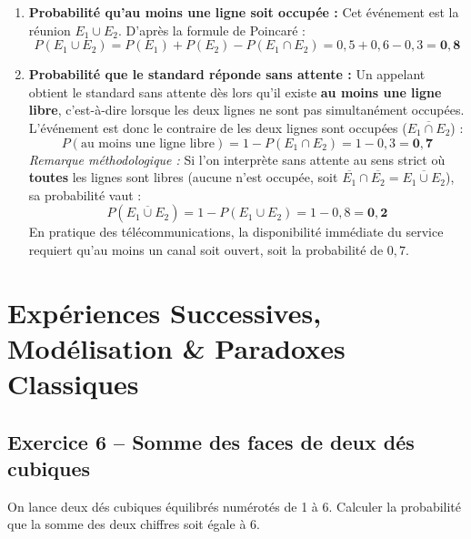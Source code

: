 \documentclass[11pt,a4paper]{article}
\begin{document}
\begin{correctionbox}
\begin{enumerate}[label=\arabic*.]
    \item \textbf{Probabilité qu'au moins une ligne soit occupée :}
    Cet événement est la réunion $E_1 \cup E_2$. D'après la formule de Poincaré :
    \[
    P(E_1 \cup E_2) = P(E_1) + P(E_2) - P(E_1 \cap E_2) = 0{,}5 + 0{,}6 - 0{,}3 = \mathbf{0{,}8}
    \]

    \item \textbf{Probabilité que le standard réponde sans attente :}
    Un appelant obtient le standard sans attente dès lors qu'il existe \textbf{au moins une ligne libre}, c'est-à-dire lorsque les deux lignes ne sont pas simultanément occupées.
    L'événement est donc le contraire de \og les deux lignes sont occupées \fg{} ($\overline{E_1 \cap E_2}$) :
    \[
    P(\text{au moins une ligne libre}) = 1 - P(E_1 \cap E_2) = 1 - 0{,}3 = \mathbf{0{,}7}
    \]
    \emph{Remarque méthodologique :} Si l'on interprète \og sans attente \fg{} au sens strict où \textbf{toutes} les lignes sont libres (aucune n'est occupée, soit $\overline{E_1} \cap \overline{E_2} = \overline{E_1 \cup E_2}$), sa probabilité vaut :
    \[
    P(\overline{E_1 \cup E_2}) = 1 - P(E_1 \cup E_2) = 1 - 0{,}8 = \mathbf{0{,}2}
    \]
    En pratique des télécommunications, la disponibilité immédiate du service requiert qu'au moins un canal soit ouvert, soit la probabilité de $0{,}7$.
\end{enumerate}
\end{correctionbox}

\vspace{0.4cm}

\section{Expériences Successives, Modélisation \& Paradoxes Classiques}

\subsection*{Exercice 6 -- Somme des faces de deux dés cubiques}

On lance deux dés cubiques équilibrés numérotés de 1 à 6. Calculer la probabilité que la somme des deux chiffres soit égale à 6.
\end{document}
